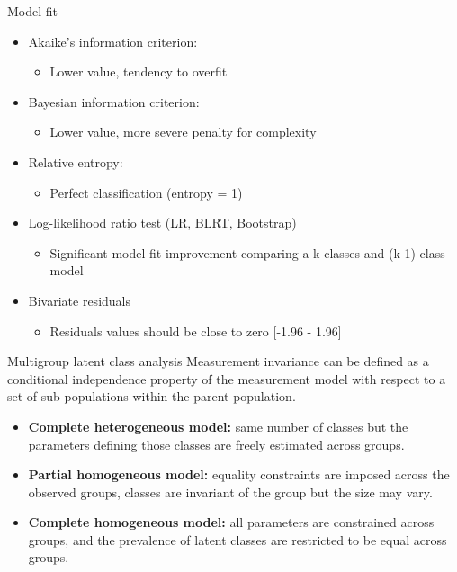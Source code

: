 \documentclass[11pt,t]{beamer}
\begin{document}
\begin{frame}[c,plain]{Model fit}
\vspace{-11pt}
\begin{itemize}
	\item Akaike's information criterion: 
\begin{itemize}
\item Lower value, tendency to overfit
\end{itemize}	
\item Bayesian information criterion: 
\begin{itemize}
\item Lower value, more severe penalty for complexity
\end{itemize}	
\item Relative entropy: 
\begin{itemize}
\item Perfect classification (entropy = 1)
\end{itemize}	
\item Log-likelihood ratio test (LR, BLRT, Bootstrap\footnotemark)
\begin{itemize}
\item Significant model fit improvement comparing a k-classes and (k-1)-class model
\end{itemize}	

\item Bivariate residuals
\begin{itemize}
\item Residuals values should be close to zero [-1.96 - 1.96]
\end{itemize}

\end{itemize}	

\end{frame}


\begin{frame}[c,plain]{Multigroup latent class analysis}
\vspace{-11pt}
Measurement invariance can be defined as a conditional independence property of the measurement model with respect to a set of sub-populations within the parent population.  
\vspace{11pt}
\begin{itemize}
\item \textbf{Complete heterogeneous model:} same number of classes but the parameters defining those classes are freely estimated across groups.

\item \textbf{Partial homogeneous model:} equality constraints are imposed across the observed groups, classes are invariant of the group but the size may vary.  

\item \textbf{Complete homogeneous model:}  all parameters are constrained across groups, and the prevalence of latent classes are restricted to be equal across groups.  
\end{itemize}
\end{frame}
\end{document}
